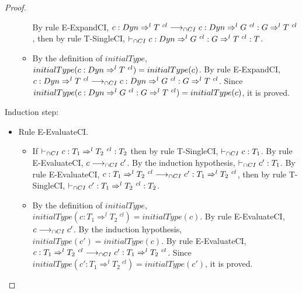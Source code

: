 \documentclass[a4paper]{article}
\begin{document}
\begin{proof}
\begin{itemize}
\begin{itemize}
        By rule E-ExpandCI, $c : Dyn \Rightarrow^l T\ ^{cl} \longrightarrow_{\cap CI} c : Dyn \Rightarrow^l G\ ^{cl} : G \Rightarrow^l T\ ^{cl}$, then by rule T-SingleCI, $\cits c : \Dyn \Rightarrow^l G\ ^{cl} : G \Rightarrow^l T\ ^{cl} : T$.
        \item By the definition of $initialType$, $initialType(c : Dyn \Rightarrow^l T\ ^{cl}) = initialType(c)$.
        By rule E-ExpandCI, $c : Dyn \Rightarrow^l T\ ^{cl} \longrightarrow_{\cap CI} c : Dyn \Rightarrow^l G\ ^{cl} : G \Rightarrow^l T\ ^{cl}$.
        Since $initialType(c : Dyn \Rightarrow^l G\ ^{cl} : G \Rightarrow^l T\ ^{cl}) = initialType(c)$, it is proved.
    \end{itemize}
\end{itemize}
Induction step:
\begin{itemize}
    \item Rule E-EvaluateCI.
    \begin{itemize}
        \item If $\cits c : T_1 \Rightarrow^l T_2\ ^{cl} : T_2$ then by rule T-SingleCI, $\vdash_{\cap CI} c : T_1$.
        By rule E-EvaluateCI, $c \longrightarrow_{\cap CI} c'$.
        By the induction hypothesis, $\vdash_{\cap CI} c' : T_1$.
        By rule E-EvaluateCI, $c : T_1 \Rightarrow^l T_2\ ^{cl} \longrightarrow_{\cap CI} c' : T_1 \Rightarrow^l T_2\ ^{cl}$, then by rule T-SingleCI, $\vdash_{\cap CI} c' : T_1 \Rightarrow^l T_2\ ^{cl} : T_2$.
        \item By the definition of $initialType$, $initialType(c : T_1 \Rightarrow^l T_2\ ^{cl}) = initialType(c)$.
        By rule E-EvaluateCI, $c \longrightarrow_{\cap CI} c'$.
        By the induction hypothesis, $initialType(c') = initialType(c)$.
        By rule E-EvaluateCI, $c : T_1 \Rightarrow^l T_2\ ^{cl} \longrightarrow_{\cap CI} c' : T_1 \Rightarrow^l T_2\ ^{cl}$.
        Since $initialType(c' : T_1 \Rightarrow^l T_2\ ^{cl}) = initialType(c')$, it is proved.
    \end{itemize}
\end{itemize}
\end{proof}
\end{document}
